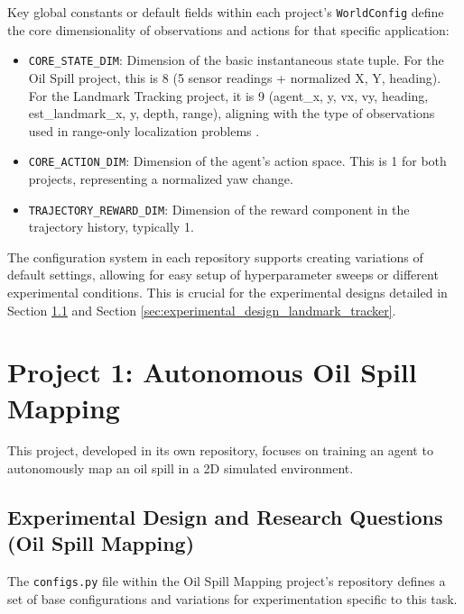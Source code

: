 \documentclass[11pt,a4paper]{article}
\newcommand{\code}[1]{\texttt{#1}} %
\begin{document}
Key global constants or default fields within each project's \code{WorldConfig} define the core dimensionality of observations and actions for that specific application:
\begin{itemize}
    \item \code{CORE\_STATE\_DIM}: Dimension of the basic instantaneous state tuple. For the Oil Spill project, this is 8 (5 sensor readings + normalized X, Y, heading). For the Landmark Tracking project, it is 9 (agent\_x, y, vx, vy, heading, est\_landmark\_x, y, depth, range), aligning with the type of observations used in range-only localization problems \cite{masmitja2023tracking}.
    \item \code{CORE\_ACTION\_DIM}: Dimension of the agent's action space. This is 1 for both projects, representing a normalized yaw change.
    \item \code{TRAJECTORY\_REWARD\_DIM}: Dimension of the reward component in the trajectory history, typically 1.
\end{itemize}
The configuration system in each repository supports creating variations of default settings, allowing for easy setup of hyperparameter sweeps or different experimental conditions. This is crucial for the experimental designs detailed in Section \ref{sec:experimental_design_oil_spill} and Section \ref{sec:experimental_design_landmark_tracker}.


\section{Project 1: Autonomous Oil Spill Mapping}
This project, developed in its own repository, focuses on training an agent to autonomously map an oil spill in a 2D simulated environment.

\subsection{Experimental Design and Research Questions (Oil Spill Mapping)}
\label{sec:experimental_design_oil_spill}
The \code{configs.py} file within the Oil Spill Mapping project's repository defines a set of base configurations and variations for experimentation specific to this task.
\end{document}

